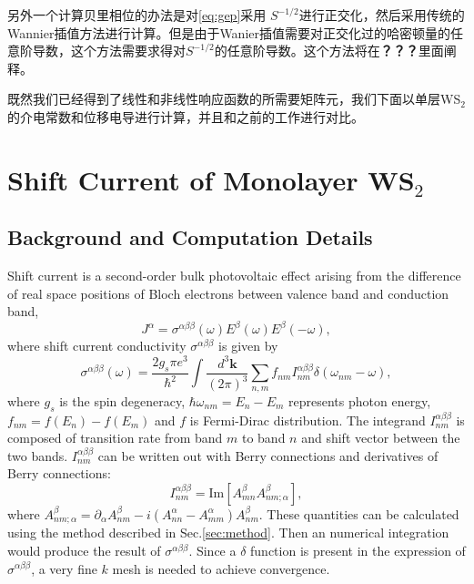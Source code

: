 另外一个计算贝里相位的办法是对\ref{eq:gep}采用 $S^{-1/2}$进行正交化，然后采用传统的Wannier插值方法进行计算。但是由于Wanier插值需要对正交化过的哈密顿量的任意阶导数，这个方法需要求得对$S^{-1/2}$的任意阶导数。这个方法将在\textbf{？？？}里面阐释。

既然我们已经得到了线性和非线性响应函数的所需要矩阵元，我们下面以单层WS$_2$的介电常数和位移电导进行计算，并且和之前的工作进行对比。

\section{Shift Current of Monolayer WS$_2$}

\subsection{Background and Computation Details}

Shift current\cite{von_baltz_theory_1981,sipe_second-order_2000,young_first_2012,tan_shift_2016} is a second-order bulk photovoltaic effect arising from the difference of real space positions of Bloch electrons between valence band and conduction band,
\begin{equation}
J^{\alpha}=\sigma^{\alpha\beta\beta}(\omega)E^{\beta}(\omega)E^{\beta}(-\omega),\label{eq:shift_current-def}
\end{equation}
where shift current conductivity $\sigma^{\alpha\beta\beta}$ is given by\cite{von_baltz_theory_1981,sipe_second-order_2000,young_first_2012,tan_shift_2016}
\begin{equation}
\sigma^{\alpha\beta\beta}(\omega)=\frac{2g_s\pi e^3}{\hbar^2}\int\frac{d^3\boldsymbol{k}}{(2\pi)^3}\sum_{n,m}f_{nm}I_{nm}^{\alpha\beta\beta}\delta(\omega_{nm}-\omega),\label{eq:shift-current}
\end{equation}
where $g_{s}$ is the spin degeneracy, $\hbar\omega_{nm}=E_{n}-E_{m}$ represents photon energy,  $f_{nm} = f(E_{n}) - f(E_{m})$ and $f$ is Fermi-Dirac distribution. The integrand $I_{nm}^{\alpha\beta\beta}$ is composed of transition rate from band $m$ to band $n$ and shift vector between the two bands. $I_{nm}^{\alpha\beta\beta}$ can be written out with Berry connections and derivatives of Berry connections:
\begin{equation}
I_{nm}^{\alpha\beta\beta}=\text{Im}[A_{mn}^{\beta}A_{nm;\alpha}^{\beta}],
\end{equation}
where $A_{nm;\alpha}^{\beta}=\partial_\alpha A_{nm}^{\beta}-i(A_{nn}^{\alpha}-A_{mm}^{\alpha})A_{nm}^{\beta}$.
These quantities can be calculated using the method described in Sec.\ref{sec:method}. Then an numerical integration would produce the result of $\sigma^{\alpha\beta\beta}$. Since a $\delta$ function is present in the expression of $\sigma^{\alpha\beta\beta}$, a very fine $k$ mesh is needed to achieve convergence.


